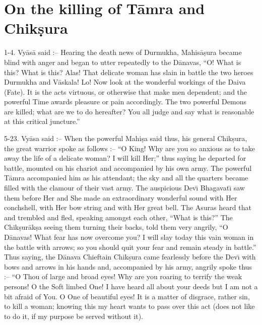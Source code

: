 \chapter{On the killing of T\=amra and Chik\d{s}ura}

1-4. Vy\=as\=a said :-- Hearing the death news of Durmukha, Mahis\=a\d{s}ura became blind with anger and began to utter repeatedly to the D\=anavas, ``O! What is this? What is this? Alas! That delicate woman has slain in battle the two heroes Durmukha and V\=askala! Lo! Now look at the wonderful workings of the Daiva (Fate). It is the acts virtuous, or otherwise that make men dependent; and the powerful Time awards pleasure or pain accordingly. The two powerful Demons are killed; what are we to do hereafter? You all judge and say what is reasonable at this critical juncture.''

5-23. Vy\=asa said :-- When the powerful Mahi\d{s}a said thus, his general Chik\d{s}ura, the great warrior spoke as follows :-- ``O King! Why are you so anxious as to take away the life of a delicate woman? I will kill Her;'' thus saying he departed for battle, mounted on his chariot and accompanied by his own army. The powerful T\=amra accompanied him as his attendant; the sky and all the quarters became filled with the clamour of their vast army. The auspicious Dev\={\i} Bhagavat\={\i} saw them before Her and She made an extraordinary wonderful sound with Her conchshell, with Her bow string and with Her great bell. The Asuras heard that and trembled and fled, speaking amongst each other, ``What is this?'' The Chik\d{s}ur\=ak\d{s}a seeing them turning their backs, told them very angrily, ``O D\=anavas! What fear has now overcome you? I will slay today this vain woman in the battle with arrows; so you should quit your fear and remain steady in battle.'' Thus saying, the D\=anava Chieftain Chik\d{s}ura came fearlessly before the Dev\={\i} with bows and arrows in his hands and, accompanied by his army, angrily spoke thus :-- ``O Thou of large and broad eyes! Why are you roaring to terrify the weak persons! O the Soft limbed One! I have heard all about your deeds but I am not a bit afraid of You. O One of beautiful eyes! It is a matter of disgrace, rather sin, to kill a woman; knowing this my heart wants to pass over this act (does not like to do it, if my purpose be served without it).

